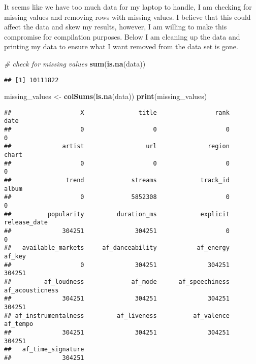 \documentclass[
]{article}
\newenvironment{Shaded}{\begin{snugshade}}{\end{snugshade}}
\newcommand{\CommentTok}[1]{\textcolor[rgb]{0.56,0.35,0.01}{\textit{#1}}}
\newcommand{\FunctionTok}[1]{\textcolor[rgb]{0.13,0.29,0.53}{\textbf{#1}}}
\newcommand{\NormalTok}[1]{#1}
\newcommand{\OtherTok}[1]{\textcolor[rgb]{0.56,0.35,0.01}{#1}}
\begin{document}
It seems like we have too much data for my laptop to handle, I am
checking for missing values and removing rows with missing values. I
believe that this could affect the data and skew my results, however, I
am willing to make this compromise for compilation purposes. Below I am
cleaning up the data and printing my data to ensure what I want removed
from the data set is gone.

\begin{Shaded}
\begin{Highlighting}[]
\CommentTok{\# check for missing values}
\FunctionTok{sum}\NormalTok{(}\FunctionTok{is.na}\NormalTok{(data))}
\end{Highlighting}
\end{Shaded}

\begin{verbatim}
## [1] 10111822
\end{verbatim}

\begin{Shaded}
\begin{Highlighting}[]
\NormalTok{missing\_values }\OtherTok{\textless{}{-}} \FunctionTok{colSums}\NormalTok{(}\FunctionTok{is.na}\NormalTok{(data))}
\FunctionTok{print}\NormalTok{(missing\_values)}
\end{Highlighting}
\end{Shaded}

\begin{verbatim}
##                   X               title                rank                date 
##                   0                   0                   0                   0 
##              artist                 url              region               chart 
##                   0                   0                   0                   0 
##               trend             streams            track_id               album 
##                   0             5852308                   0                   0 
##          popularity         duration_ms            explicit        release_date 
##              304251              304251                   0                   0 
##   available_markets     af_danceability           af_energy              af_key 
##                   0              304251              304251              304251 
##         af_loudness             af_mode      af_speechiness     af_acousticness 
##              304251              304251              304251              304251 
## af_instrumentalness         af_liveness          af_valence            af_tempo 
##              304251              304251              304251              304251 
##   af_time_signature 
##              304251
\end{verbatim}
\end{document}
